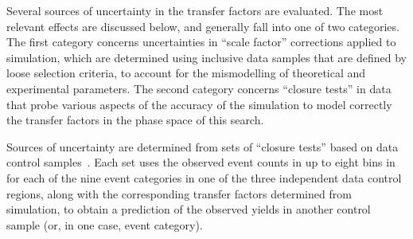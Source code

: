 Several sources of uncertainty in the transfer factors are evaluated.
The most relevant effects are discussed below, and generally fall into
one of two categories. The first category concerns uncertainties in
``scale factor'' corrections applied to simulation, which are
determined using inclusive data samples that are defined by loose
selection criteria, to account for the mismodelling of theoretical and
experimental parameters. The second category concerns ``closure
tests'' in data that probe various aspects of the accuracy of the
simulation to model correctly the transfer factors in the phase space
of this search.


Sources of uncertainty are determined from sets of ``closure tests''
based on data control samples~\cite{RA1Paper2012}. Each set uses the
observed event counts in up to eight bins in \scalht for each of the
nine \njet event categories in one of the three independent data
control regions, along with the corresponding transfer factors
determined from simulation, to obtain a prediction of the observed
yields in another control sample (or, in one case, \nb event
category).

